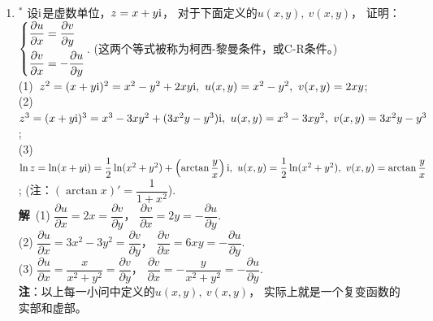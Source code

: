 \begin{enumerate}[label={【\textbf{例\thechapter.\arabic*}】},
 leftmargin=\inteval{\myenumleftmargin}pt,
 itemsep=\inteval{\myenumitempsep}pt,
 itemindent=\inteval{\myenumitemindent}pt]
\item $^*$ 设$ \mathrm{i} $是虚数单位，$ z=x+y\mathrm{i} $，
对于下面定义的$ u(x,y),\ v(x,y) $，
证明：$ \begin{dcases}
    \dfrac{\partial u}{\partial x} =\dfrac{\partial v}{\partial y} \\
    \dfrac{\partial v}{\partial x} =-\dfrac{\partial u}{\partial y} 
\end{dcases} $. (这两个等式被称为柯西-黎曼条件，或C-R条件。)\\
(1)\ $ z^2=(x+y\i)^2=x^2-y^2+2xy\i,\ u(x,y)=x^2-y^2,\ v(x,y)=2xy $; \\
(2)\ $ z^3=(x+y\i)^3=x^3-3xy^2+(3x^2y-y^3)\i,\ u(x,y)=x^3-3xy^2,\ 
v(x,y)=3x^2y-y^3 $; \\
(3)\ $ \ln z=\ln(x+y\mathrm{i})=\dfrac{1}{2}\ln(x^2+y^2)+\left(\arctan\dfrac{y}{x}\right)\mathrm{i},
\ u(x,y)=\dfrac{1}{2}\ln(x^2+y^2),\ v(x,y)=\arctan\dfrac{y}{x} $; 
(注：$ (\arctan x)'=\dfrac{1}{1+x^2} $). \\
\textbf{解}\ (1) $ \dfrac{\partial u}{\partial x} =2x=
\dfrac{\partial v}{\partial y} $，
$ \dfrac{\partial v}{\partial x} =2y=
-\dfrac{\partial u}{\partial y} $. \\
(2) $ \dfrac{\partial u}{\partial x} =3x^2-3y^2=
\dfrac{\partial v}{\partial y} $，
$ \dfrac{\partial v}{\partial x} =6xy=
-\dfrac{\partial u}{\partial y} $. \\
(3) $ \dfrac{\partial u}{\partial x} =\dfrac{x}{x^2+y^2}=
\dfrac{\partial v}{\partial y} $，
$ \dfrac{\partial v}{\partial x} = -\dfrac{y}{x^2+y^2}=
-\dfrac{\partial u}{\partial y} $. \\
\textbf{注}：以上每一小问中定义的$ u(x,y),\ v(x,y) $，
实际上就是一个复变函数的实部和虚部。


\end{enumerate}
